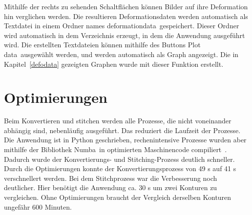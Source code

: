 Mithilfe der rechts zu sehenden Schaltflächen können Bilder auf ihre Deformation hin 
verglichen werden. Die resultieren Deformationsdaten werden automatisch als Textdatei
in einem Ordner names \glqq deformation\textunderscore data\grqq~gespeichert. 
Dieser Ordner wird automatisch in dem Verzeichnis erzeugt, in dem die Anwendung ausgeführt wird. 
Die erstellten Textdateien können mithilfe des Buttons \glqq Plot data\grqq~ausgewählt 
werden, und werden automatisch als Graph angezeigt.
Die in Kapitel~\ref{defodata} gezeigten Graphen wurde mit dieser Funktion erstellt.

\section{Optimierungen}

Beim Konvertieren und stitchen werden alle Prozesse, die nicht voneinander abhängig sind,  
nebenläufig ausgeführt. Das reduziert die Laufzeit der Prozesse.
Die Anwendung ist in Python geschrieben, rechenintensive Prozesse wurden aber mithilfe 
der Bibliothek \glqq Numba\grqq~in optimierten Maschinencode compiliert~\cite{numba}.
Dadurch wurde der Konvertierungs- und Stitching-Prozess deutlich schneller. 
Durch die Optimierungen konnte der Konvertierungsprozess von 49 s auf 41 s verschnellert 
werden. Bei dem Stitchprozess war die Verbesserung noch deutlicher. Hier benötigt die 
Anwendung ca. 30 s um zwei Konturen zu vergleichen.
Ohne Optimierungen braucht der Vergleich derselben Konturen 
ungefähr 600 Minuten.
